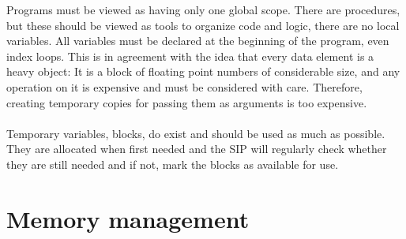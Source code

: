 \documentclass[12pt]{article}
\begin{document}
Programs must be viewed as having only one global scope. There are procedures, but 
these should be viewed as tools to organize code and logic, there are no local variables. 
All variables must be declared at the beginning of the program, even index loops. 
This is in agreement with the idea that every data element is a heavy object: It is a 
block of floating point numbers of considerable size, and any operation on it is 
expensive and must be considered with care. Therefore, creating temporary copies for 
passing them as arguments is too expensive.\\
\\ 
Temporary variables, blocks, do exist and should be used as much as possible. They 
are allocated when first needed and the SIP will regularly check whether they are 
still needed and if not, mark the blocks as available for use.\\

\section{\bf Memory management}
\end{document}
